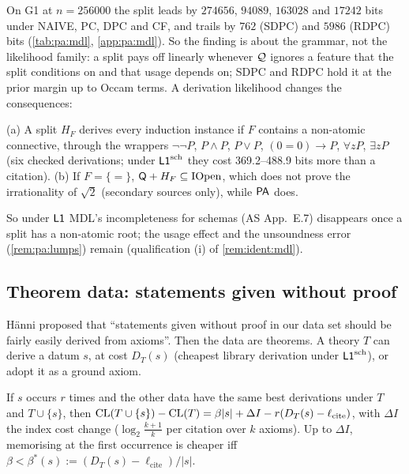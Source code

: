 \noindent On G1 at $n=256000$ the split leads by $274656$, $94089$, $163028$ and $17242$ bits under NAIVE, PC, DPC and CF, and trails by $762$ (SDPC) and $5986$ (RDPC) bits (\cref{tab:pa:mdl}, \cref{app:pa:mdl}). So the finding is about the grammar, not the likelihood family: a split pays off linearly whenever $\mathcal{Q}$ ignores a feature that the split conditions on and that usage depends on; SDPC and RDPC hold it at the prior margin up to Occam terms. A derivation likelihood changes the consequences:

\begin{proposition}[Detours]\pabrk{}\label{prop:pa:detour}
(a) A split $H_F$ derives every induction instance if $F$ contains a non-atomic connective, through the wrappers $\neg\neg P$, $P\wedge P$, $P\vee P$, $(0=0)\to P$, $\forall zP$, $\exists zP$ (six checked derivations; under $\mathord{\mathsf{L1}}^{\mathrm{sch}}$ they cost 369.2--488.9 bits more than a citation). (b) If $F=\{=\}$, $\mathsf{Q}+H_F\subseteq\mathrm{IOpen}$, which does not prove the irrationality of $\sqrt2$ \citep{shepherdson1964nonstandard} (secondary sources only), while $\mathsf{PA}$ does.
\end{proposition}

\noindent So under $\mathord{\mathsf{L1}}$ MDL's incompleteness for schemas (AS App.~E.7) disappears once a split has a non-atomic root; the usage effect and the unsoundness error (\cref{rem:pa:lumps}) remain (qualification (i) of \cref{rem:ident:mdl}).

\subsection{Theorem data: statements given without proof}\label{sec:pa:theorems}

H\"anni proposed that ``statements given without proof in our data set should be fairly easily derived from axioms''. Then the data are theorems. A theory $T$ can derive a datum $s$, at cost $D_T(s)$ (cheapest library derivation under $\mathord{\mathsf{L1}}^{\mathrm{sch}}$), or adopt it as a ground axiom.

\begin{proposition}\pabrk{}\label{prop:pa:memo}
If $s$ occurs $r$ times and the other data have the same best derivations under $T$ and $T\cup\{s\}$, then $\mathrm{CL}(T\cup\{s\})-\mathrm{CL}(T)=\beta|s|+\Delta I-r(D_T(s)-\ell_{\mathrm{cite}})$, with $\Delta I$ the index cost change ($\log_2\frac{k+1}k$ per citation over $k$ axioms). Up to $\Delta I$, memorising at the first occurrence is cheaper iff $\beta<\beta^*(s):=(D_T(s)-\ell_{\mathrm{cite}})/|s|$.
\end{proposition}

